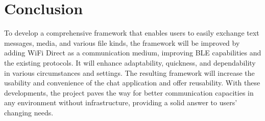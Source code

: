 \documentclass[12pt, conference, onecolumn, a4paper]{IEEEtran}
\begin{document}
\newpage
\newpage

\section{Conclusion}

To develop a comprehensive framework that enables users to easily exchange text
messages, media, and various file kinds, the framework will be improved by
adding WiFi Direct as a communication medium, improving BLE capabilities and
the existing protocols. It will enhance adaptability, quickness, and
dependability in various circumstances and settings. The resulting framework
will increase the usability and convenience of the chat application and offer
reusability. With these developments, the project paves the way for better
communication capacities in any environment without infrastructure, providing a
solid answer to users' changing needs.


% 
% 


\end{document}
